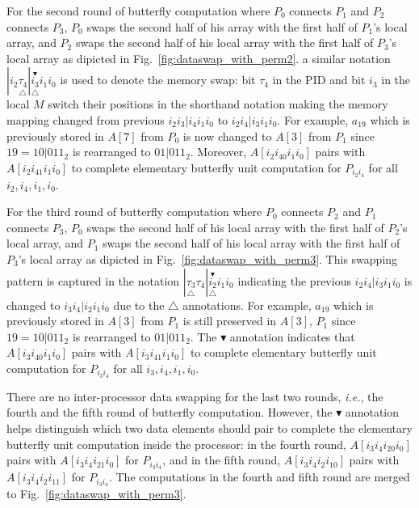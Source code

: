 \documentclass{iacrtrans}
\theoremstyle{plain}
\begin{document}
For the second round of butterfly computation where $P_0$ connects $P_1$ and $P_2$ connects $P_3$, $P_0$ swaps the second half of his array with the first half of $P_1$'s local array, and $P_2$ swaps the second half of his local array with the first half of $P_3$'s local array as dipicted in Fig.~\ref{fig:dataswap_with_perm2}.  a similar notation $|i_2\underset{\triangle}{\tau_4}|\overset{\blacktriangledown}{\underset{\triangle}{i_3}}i_1i_0$ is used to denote the memory swap: bit $\tau_4$ in the PID and bit $i_3$ in the local $M$ switch their positions in the shorthand notation making the memory mapping changed from previous $i_2i_3|i_4i_1i_0$ to $i_2i_4|i_3i_1i_0$. For example, $a_{19}$ which is previously stored in $A[7]$ from $P_0$ is now changed to $A[3]$ from $P_1$ since $19=10|011_2$ is rearranged to $01|011_2$. Moreover, $A[i_2i_40i_1i_0]$ pairs with $A[i_2i_41i_1i_0]$ to complete elementary butterfly unit computation for $P_{i_2i_4}$ for all $i_2,i_4,i_1,i_0$. 

For the third round of butterfly computation where $P_0$ connects $P_2$ and $P_1$ connects $P_3$, $P_0$ swaps the  second half of his local array with the first half of $P_2$'s local array, and $P_1$ swaps the second half of his local array with the first half of $P_3$'s local array as dipicted in Fig.~\ref{fig:dataswap_with_perm3}. This swapping pattern is captured in the notation $|\underset{\triangle}{\tau_3}\tau_4|\overset{\blacktriangledown}{\underset{\triangle}{i_2}}i_1i_0$ indicating the previous $i_2i_4|i_3i_1i_0$ is changed to $i_3i_4|i_2i_1i_0$ due to the $\triangle$ annotations. For example, $a_{19}$ which is previously stored in $A[3]$ from $P_1$ is still preserved in $A[3]$, $P_1$ since $19=10|011_2$ is rearranged to $01|011_2$. The $\blacktriangledown$ annotation indicates that $A[i_3i_40i_1i_0]$ pairs with $A[i_3i_41i_1i_0]$ to complete elementary butterfly unit computation for $P_{i_3i_4}$ for all $i_3,i_4,i_1,i_0$.

There are no inter-processor data swapping for the last two rounds, \textit{i.e.}, the fourth and the fifth round of butterfly computation. However, the $\blacktriangledown$ annotation helps distinguish which two data elements should pair to complete the elementary butterfly unit computation inside the processor: in the fourth round, $A[i_3i_4i_20i_0]$ pairs with $A[i_3i_4i_21i_0]$ for $P_{i_3i_4}$, and in the fifth round, $A[i_3i_4i_2i_10]$ pairs with $A[i_3i_4i_2i_11]$ for $P_{i_3i_4}$. The computations in the fourth and fifth round are merged to Fig.~\ref{fig:dataswap_with_perm3}.
\end{document}
